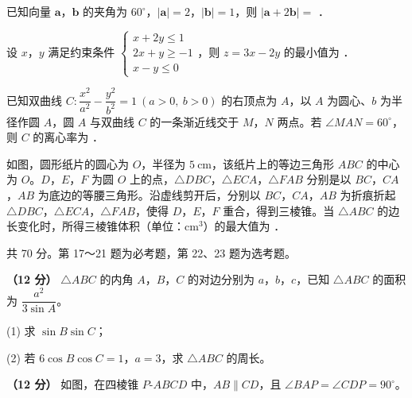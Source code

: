 已知向量 $\boldsymbol a$，$\boldsymbol b$ 的夹角为 $60^\circ$，$|\boldsymbol a|=2$，$|\boldsymbol b|=1$，则 $|\boldsymbol a+2\boldsymbol b|=$ \gkblank{}．

设 $x$，$y$ 满足约束条件 $\begin{cases}x+2y\le1\\ 2x+y\ge-1\\ x-y\le0\end{cases}$，则 $z=3x-2y$ 的最小值为 \gkblank{}．

已知双曲线 $C:\dfrac{x^{2}}{a^{2}}-\dfrac{y^{2}}{b^{2}}=1\ (a>0,\ b>0)$ 的右顶点为 $A$，以 $A$ 为圆心、$b$ 为半径作圆 $A$，圆 $A$ 与双曲线 $C$ 的一条渐近线交于 $M$，$N$ 两点。若 $\angle MAN=60^\circ$，则 $C$ 的离心率为 \gkblank{}．

如图，圆形纸片的圆心为 $O$，半径为 $5\ \mathrm{cm}$，该纸片上的等边三角形 $ABC$ 的中心为 $O$。$D$，$E$，$F$ 为圆 $O$ 上的点，$\triangle DBC$，$\triangle ECA$，$\triangle FAB$ 分别是以 $BC$，$CA$，$AB$ 为底边的等腰三角形。沿虚线剪开后，分别以 $BC$，$CA$，$AB$ 为折痕折起 $\triangle DBC$，$\triangle ECA$，$\triangle FAB$，使得 $D$，$E$，$F$ 重合，得到三棱锥。当 $\triangle ABC$ 的边长变化时，所得三棱锥体积（单位：$\mathrm{cm}^{3}$）的最大值为 \gkblank{}．

\begin{center}\end{center}

\par\medskip


\begin{gktip}
共 70 分。第 17～21 题为必考题，第 22、23 题为选考题。
\end{gktip}


\textbf{（12 分）} $\triangle ABC$ 的内角 $A$，$B$，$C$ 的对边分别为 $a$，$b$，$c$，已知 $\triangle ABC$ 的面积为 $\dfrac{a^{2}}{3\sin A}$。

  (1) 求 $\sin B\sin C$；

  (2) 若 $6\cos B\cos C=1$，$a=3$，求 $\triangle ABC$ 的周长。

\textbf{（12 分）} 如图，在四棱锥 $P\text{-}ABCD$ 中，$AB\parallel CD$，且 $\angle BAP=\angle CDP=90^\circ$。

\begin{center}\end{center}

